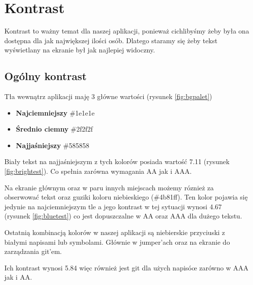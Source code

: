 \chapter{Kontrast}
Kontrast to ważny temat dla naszej aplikacji, ponieważ cichlibyśmy żeby była ona dostępna dla jak największej ilości osób. Dlatego staramy się żeby tekst wyświetlany na ekranie był jak najlepiej widoczny.
\section{Ogólny kontrast}
Tła wewnątrz aplikacji maję 3 główne wartości (rysunek \ref{fig:bgpalet})

\begin{itemize}
    \item \textbf{Najciemniejszy} \#1e1e1e
    \item \textbf{Średnio ciemny} \#2f2f2f
    \item \textbf{Najjaśniejszy} \#585858
\end{itemize}


Biały tekst na najjaśniejszym z tych kolorów posiada wartość 7.11 (rysunek \ref{fig:brightest}). Co spełnia zarówna wymagania AA jak i AAA.

Na ekranie głównym oraz w paru innych miejscach możemy róznież za obserwować tekst oraz guziki koloru niebieskiego (\#4b81ff). Ten kolor pojawia się jedynie na najciemniejszym tle a jego kontrast w tej sytuacji wynosi 4.67 (rysunek \ref{fig:bluetest}) co jest dopuszczalne w AA oraz AAA dla dużego tekstu.

Ostatnią kombinacją kolorów w naszej aplikacji są niebierskie przyciuski z białymi napisami lub symbolami. Głównie w jumper'ach oraz na ekranie do zarządzania git'em.

Ich kontrast wynosi 5.84 więc również jest git dla użych napisóœ zarówno w AAA jak i AA.
